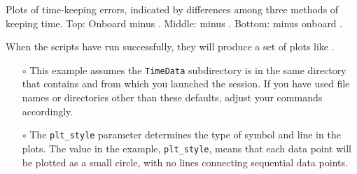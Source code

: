 \begin{enumerate}
	\smallskip
	\begin{marginfigure}[-4.cm]
		\begin{center}
			\caption[Plots of time-keeping errors]{Plots of time-keeping errors, indicated by differences among three methods of keeping time. 
			Top: Onboard \rtc minus  \rtc. Middle: \ntp minus  \rtc. Bottom: \ntp minus onboard \rtc. }
		\end{center}
	\end{marginfigure}
	
	When the scripts have run successfully, they will produce a set of plots like .
	\begin{itemize}
		\item[$\circ$] This example assumes the \lstinline{TimeData} subdirectory is in the same directory that contains  and from which you launched the \python session.
		If you have used file names or directories other than these defaults, adjust your commands accordingly. 
		\item[$\circ$] The \lstinline{plt_style} parameter determines the type of symbol and line in the plots. 
		The value in the example, \lstinline{plt_style}, means that each data point will be plotted as a small circle, with no lines connecting sequential data points.
	\end{itemize}


\end{enumerate}
